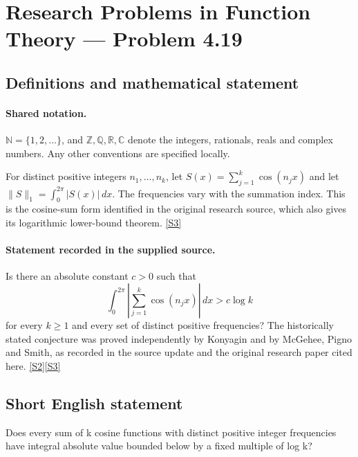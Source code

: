 \documentclass[11pt]{book}
\newcommand{\sref}[2]{\hyperlink{source:#1:#2}{[S#2]}}
\begin{document}
\section{Research Problems in Function Theory — Problem 4.19}\label{statement}

\subsection{Definitions and mathematical statement}

\paragraph{Shared notation.}$\mathbb N=\{1,2,\ldots\}$, and $\mathbb Z,\mathbb Q,\mathbb R,\mathbb C$ denote the integers, rationals, reals and complex numbers. Any other conventions are specified locally.


For distinct positive integers $n_1,\ldots,n_k$, let $S(x)=\sum_{j=1}^k\cos(n_jx)$ and let $\|S\|_1=\int_0^{2\pi}|S(x)|\,dx$. The frequencies vary with the summation index. This is the cosine-sum form identified in the original research source, which also gives its logarithmic lower-bound theorem. \sref{statement}{3}
\paragraph{Statement recorded in the supplied source.}
Is there an absolute constant $c>0$ such that
\[\int_0^{2\pi}\left|\sum_{j=1}^k\cos(n_jx)\right|\,dx>c\log k\]
for every $k\ge1$ and every set of distinct positive frequencies? The historically stated conjecture was proved independently by Konyagin and by McGehee, Pigno and Smith, as recorded in the source update and the original research paper cited here. \sref{statement}{2}\sref{statement}{3}
\subsection{Short English statement}
Does every sum of k cosine functions with distinct positive integer frequencies have integral absolute value bounded below by a fixed multiple of log k?
\end{document}
